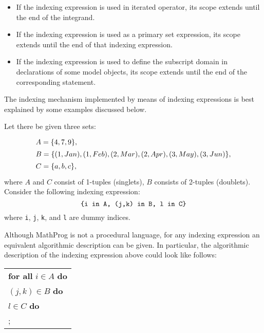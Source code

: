 \documentclass[11pt]{report}
\begin{document}
\vspace*{-8pt}

\begin{itemize}
\item If the indexing expression is used in iterated operator, its
scope extends until the end of the integrand.
\item If the indexing expression is used as a primary set expression,
its scope extends until the end of that indexing expression.
\item If the indexing expression is used to define the subscript domain
in declarations of some model objects, its scope extends until the end
of the corresponding statement.
\end{itemize}

\vspace*{-8pt}

The indexing mechanism implemented by means of indexing expressions is
best explained by some examples discussed below.

Let there be given three sets:
$$
{\def\arraystretch{1.4}
\begin{array}{l}
A=\{4,7,9\},\\
B=\{(1,Jan),(1,Feb),(2,Mar),(2,Apr),(3,May),(3,Jun)\},\\
C=\{a,b,c\},\\
\end{array}
}
$$
where $A$ and $C$ consist of 1-tuples (singlets), $B$ consists of
2-tuples (doublets). Consider the following indexing expression:
$$\mbox{{\tt\{i in A, (j,k) in B, l in C\}}}$$
where {\tt i}, {\tt j}, {\tt k}, and {\tt l} are dummy indices.

\newpage

Although MathProg is not a procedural language, for any indexing
expression an equivalent algorithmic description can be given. In
particular, the algorithmic description of the indexing expression
above could look like follows:

\noindent\hfil
\begin{tabular}{@{}l@{}}
{\bf for all} $i\in A$ {\bf do}\\
\hspace{16pt}{\bf for all} $(j,k)\in B$ {\bf do}\\
\hspace{32pt}{\bf for all} $l\in C$ {\bf do}\\
\hspace{48pt}{\it action};\\
\end{tabular}
\end{document}
